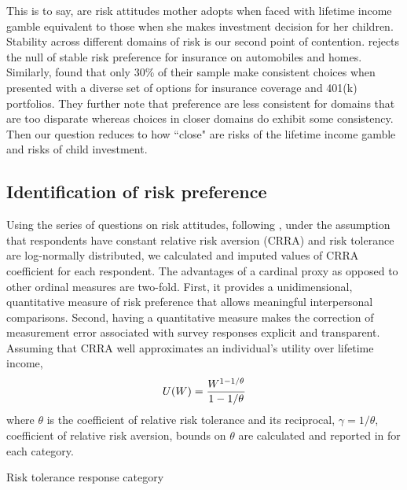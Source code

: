 \documentclass[]{article}
\begin{document}
\alert{This is to say, are risk attitudes mother adopts when faced with lifetime income gamble equivalent to those when she makes investment decision for her children. Stability across different domains of risk is our second point of contention. \citet{barseghyan2011risk} rejects the null of stable risk preference for insurance on automobiles and homes. Similarly, \citet{einav2012general} found that only 30\% of their sample make consistent choices when presented with a diverse set of options for insurance coverage and 401(k) portfolios. They further note that preference are less consistent for domains that are too disparate whereas choices in closer domains do exhibit some consistency. Then our question reduces to how ``close" are risks of the lifetime income gamble and risks of child investment.}


\subsection{Identification of risk preference}

Using the series of questions on risk attitudes, following \citet{kimball2008imputing,kimball2009risk}, under the assumption that respondents have constant relative risk aversion (CRRA) and risk tolerance are log-normally distributed, we calculated and imputed values of CRRA coefficient for each respondent. The advantages of a cardinal proxy as opposed to other ordinal measures are two-fold. First, it provides a unidimensional, quantitative measure of risk preference that allows meaningful interpersonal comparisons. Second, having a quantitative measure makes the correction of measurement error associated with survey responses explicit and transparent. Assuming that CRRA well approximates an individual's utility over lifetime income,
\[U(W)={W^{1-{1/\theta}}\over 1-{1/\theta}}\]
where $\theta$ is the coefficient of relative risk tolerance and its reciprocal, $\gamma = 1/\theta$, coefficient of relative risk aversion, bounds on $\theta$ are calculated and reported in  for each category. 

\begin{table}[!b]
	\centering
	\setlength{\extrarowheight}{0.3em}
	\caption{Risk tolerance response category}	
	
	\label{table:risk-bound}
\end{table}
\end{document}
